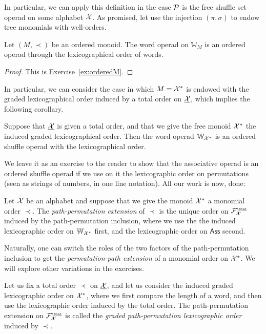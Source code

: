 In particular, we can apply this definition in the case ${\mathcal{P}}$
is the free shuffle set operad on some alphabet $\mathcal{X}$. As
promised, let use 
the injection $(\pi,\sigma)$ to endow tree monomials with
well-orders. 

\begin{proposition}
Let $(M,\prec)$ be an ordered monoid. The
word operad on $\mathbb W_M$ is an ordered operad
through the lexicographical order of words.
\end{proposition}

\begin{proof}
This is Exercise~\ref{ex:orderedM}.
\end{proof}

In particular, we can consider the case in which $M = \mathcal{X}^*$
is endowed with the graded lexicographical order induced by
a total order on $\underline{\mathcal{X}}$, which implies the following
corollary.

\begin{corollary}
Suppose that $\underline{\mathcal{X}}$ is given a total order, and that
we give the free monoid $\mathcal{X}^*$ the induced graded 
lexicographical order. Then
the word operad $\mathbb{W}_{\mathcal{X}^*}$ is an ordered
shuffle operad with the lexicographical order.
\end{corollary}

We leave it as an exercise to the reader to show that the
associative operad is an ordered shuffle operad if we
use on it the lexicographic order on permutations
(seen as strings of numbers, in one line notation).
All our work is now, done:

\begin{definition}
Let $\mathcal{X}$ be an alphabet and suppose that we
give the monoid $\mathcal{X}^*$ a monomial order $\prec$.
The \emph{path-permutation extension} of $\prec$ is the
unique order on $\FF_{\XX}^\Sha$ induced by
the path-permutation inclusion, where we use the
the induced lexicographic
order on $\mathbb{W}_{\mathcal{X}^*}$ first, and the
lexicographic order on $\mathsf{Ass}$ second.
\end{definition}

Naturally, one can switch the roles of the two
factors of the path-permutation inclusion to get
the \emph{permutation-path extension} of a monomial
order on $\mathcal{X}^*$. We will explore other variations
in the exercises.

\begin{definition}
Let us fix a total order $\prec$ on $\underline{\mathcal{X}}$, and let us
consider the induced graded lexicographic order on 
$\mathcal{X}^*$, where we first compare the length of a 
word, and then use the lexicographic order induced
by the total order. The path-permutation extension 
on $\FF_\XX^\Sha$ is called the  \emph{graded path-permutation 
lexicographic order} induced by $\prec$.
\end{definition}


